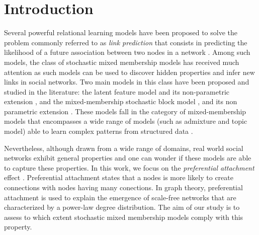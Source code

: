 
\section{Introduction}
\label{sec:intro}

Several powerful relational learning models have been proposed to solve the problem commonly referred to as \textit{link prediction} that consists in predicting the likelihood of a future association between two nodes in a network \cite{LibenNowell07,HassanZaki11}. Among such models, the class of stochastic mixed membership models has received much attention as such models can be used to discover hidden properties and infer new links in social networks. Two main models in this class have been proposed and studied in the literature: the latent feature model \cite{BMF} and its non-parametric extension \cite{ILFRM}, and the mixed-membership stochastic block model \cite{MMSB}, and its non parametric extension \cite{iMMSB,fan2015dynamic}. These models fall in the category of mixed-membership models that encompasses a wide range of models (such as admixture and topic model) able to  learn complex patterns from structured data \cite{airoldi2014handbook}.

Nevertheless, although drawn from a wide range of domains, real world social networks exhibit general properties and one can wonder if these models are able to capture these properties. In this work, we focus on the \textit{preferential attachment} effect \cite{Newman2010, Barabasi2003}. Preferential attachment states that a nodes is more likely to create connections with nodes having many conections. In graph theory, preferential attachment is used to explain the emergence of scale-free networks that are characterized by a power-law degree distribution. The aim of our study is to assess to which extent stochastic mixed membership models comply with this property.

